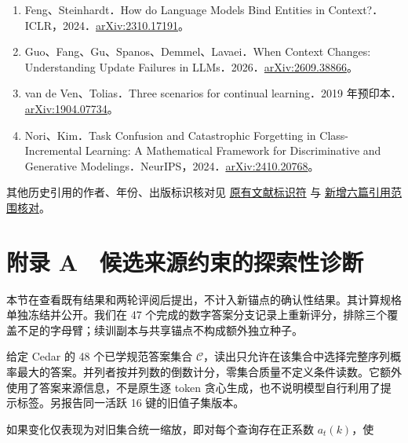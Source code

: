 \documentclass[UTF8,fontset=fandol,10pt,a4paper]{ctexart}
\begin{document}
\begin{enumerate}
\item
Feng、Steinhardt．How do Language Models Bind Entities in Context?．ICLR，2024．\href{https://arxiv.org/abs/2310.17191}{arXiv:2310.17191}。



\item
Guo、Fang、Gu、Spanos、Demmel、Lavaei．When Context Changes: Understanding Update Failures in LLMs．2026．\href{https://arxiv.org/abs/2609.38866}{arXiv:2609.38866}。



\item
van de Ven、Tolias．Three scenarios for continual learning．2019 年预印本．\href{https://arxiv.org/abs/1904.07734}{arXiv:1904.07734}。



\item
Nori、Kim．Task Confusion and Catastrophic Forgetting in Class-Incremental Learning: A Mathematical Framework for Discriminative and Generative Modelings．NeurIPS，2024．\href{https://arxiv.org/abs/2410.20768}{arXiv:2410.20768}。



\end{enumerate}
其他历史引用的作者、年份、出版标识核对见 \href{https://github.com/soloduist-pixiv/lora-binding-interference/blob/main/paper/reference_identifiers.md}{原有文献标识符} 与 \href{https://github.com/soloduist-pixiv/lora-binding-interference/blob/main/paper/revision2_reference_audit.md}{新增六篇引用范围核对}。



\section*{附录 A　候选来源约束的探索性诊断}
本节在查看既有结果和两轮评阅后提出，不计入新锚点的确认性结果。其计算规格单独冻结并公开。我们在 47 个完成的数字答案分支记录上重新评分，排除三个覆盖不足的字母臂；续训副本与共享锚点不构成额外独立种子。



给定 Cedar 的 48 个已学规范答案集合 $\mathcal C$，读出只允许在该集合中选择完整序列概率最大的答案。并列者按并列数的倒数计分，零集合质量不定义条件读数。它额外使用了答案来源信息，不是原生逐 token 贪心生成，也不说明模型自行利用了提示标签。另报告同一活跃 16 键的旧值子集版本。



如果变化仅表现为对旧集合统一缩放，即对每个查询存在正系数 $a_t(k)$，使
\end{document}

